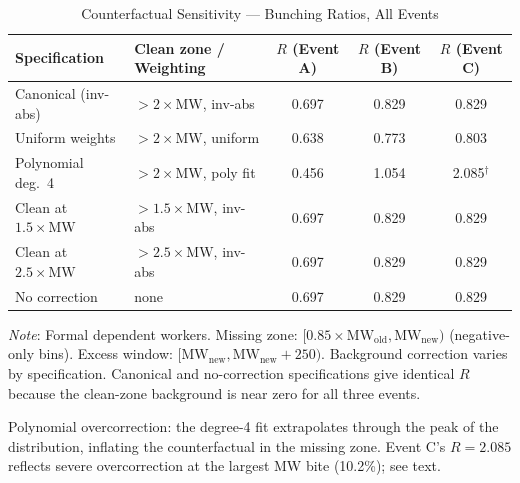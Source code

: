 \documentclass[12pt]{article}
\begin{document}
\begin{table}[H]
\centering
\caption{Counterfactual Sensitivity --- Bunching Ratios, All Events}
\label{tab:sensitivity}
\begin{threeparttable}
\small
\begin{tabular}{llccc}
\toprule
Specification & Clean zone / Weighting & $R$ (Event A) & $R$ (Event B) & $R$ (Event C) \\
\midrule
Canonical (inv-abs)          & $> 2\times\text{MW}$, inv-abs    & 0.697 & 0.829 & 0.829 \\
Uniform weights              & $> 2\times\text{MW}$, uniform    & 0.638 & 0.773 & 0.803 \\
Polynomial deg.\ 4           & $> 2\times\text{MW}$, poly fit   & 0.456 & 1.054 & 2.085$^{\dagger}$ \\
Clean at $1.5\times\text{MW}$ & $> 1.5\times\text{MW}$, inv-abs & 0.697 & 0.829 & 0.829 \\
Clean at $2.5\times\text{MW}$ & $> 2.5\times\text{MW}$, inv-abs & 0.697 & 0.829 & 0.829 \\
No correction                & none                             & 0.697 & 0.829 & 0.829 \\
\bottomrule
\end{tabular}
\begin{tablenotes}
\small
\item \textit{Note}: Formal dependent workers. Missing zone: $[0.85 \times \text{MW}_\text{old}, \text{MW}_\text{new})$ (negative-only bins). Excess window: $[\text{MW}_\text{new}, \text{MW}_\text{new} + 250)$. Background correction varies by specification. Canonical and no-correction specifications give identical $R$ because the clean-zone background is near zero for all three events.
\item[$\dagger$] Polynomial overcorrection: the degree-4 fit extrapolates through the peak of the distribution, inflating the counterfactual in the missing zone. Event C's $R = 2.085$ reflects severe overcorrection at the largest MW bite (10.2\%); see text.
\end{tablenotes}
\end{threeparttable}
\end{table}
\end{document}

